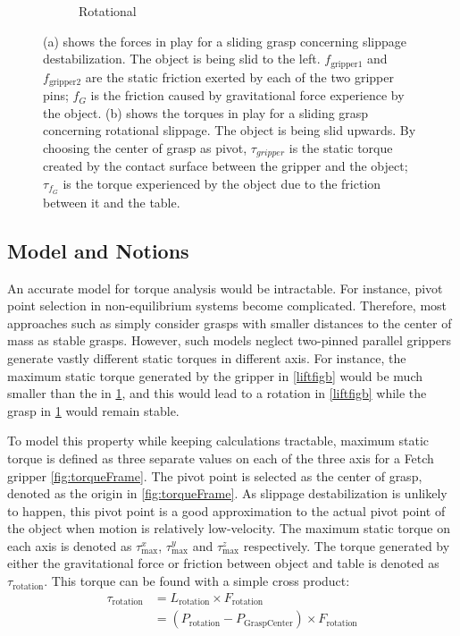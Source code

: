 \documentclass[12pt]{ucsddissertation}
\begin{document}
\begin{figure}
\begin{subfigure}[b]{0.407\linewidth}
		\caption{Rotational}\label{slidefigb}
	\end{subfigure}%
	\caption[Slippage and rotational destablization illustrations for sliding grasps.]{(a) shows the forces in play for a sliding grasp concerning slippage destabilization. The object is being slid to the left. $f_{\textrm{gripper1}}$ and $f_{\textrm{gripper2}}$ are the static friction exerted by each of the two gripper pins; $f_G$ is the friction caused by gravitational force experience by the object. (b) shows the torques in play for a sliding grasp concerning rotational slippage. The object is being slid upwards. By choosing the center of grasp as pivot, $\tau_{gripper}$ is the static torque created by the contact surface between the gripper and the object; $\tau_{f_G}$ is the torque experienced by the object due to the friction between it and the table.}
	\label{fig:slideIllustrations}
\end{figure}



\subsection{Model and Notions}
An accurate model for torque analysis would be intractable. For instance, pivot point selection in non-equilibrium systems become complicated. Therefore, most approaches such as \cite{Kanoulas_Lee_Caldwell_Tsagarakis_2018} simply consider grasps with smaller distances to the center of mass as stable grasps. However, such models neglect two-pinned parallel grippers generate vastly different static torques in different axis.  For instance, the maximum static torque generated by the gripper in \ref{liftfigb} would be much smaller than the in \ref{slidefigb}, and this would lead to a rotation in \ref{liftfigb} while the grasp in \ref{slidefigb} would remain stable.

To model this property while keeping calculations tractable, maximum static torque is defined as three separate values on each of the three axis for a Fetch \cite{Wise2016FetchF} gripper \ref{fig:torqueFrame}. The pivot point is selected as the center of grasp, denoted as the origin in \ref{fig:torqueFrame}. As slippage destabilization is unlikely to happen, this pivot point is a good approximation to the actual pivot point of the object when motion is relatively low-velocity. The maximum static torque on each axis is denoted as $\tau_{\mathrm{max}}^x$, $\tau_{\mathrm{max}}^y$ and $\tau_{\mathrm{max}}^z$ respectively. The torque generated by either the gravitational force or friction between object and table is denoted as $\tau_{\mathrm{rotation}}$. This torque can be found with a simple cross product:
\[
\begin{aligned}
\tau_{\mathrm{rotation}} &= L_{\mathrm{rotation}} \times F_{\mathrm{rotation}}\\
						&= ( P_{\mathrm{rotation}} - P_{\mathrm{GraspCenter}} ) \times F_{\mathrm{rotation}}
\end{aligned}
\]
\end{document}
